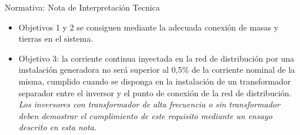\documentclass[aspectratio=169, usenames,svgnames,dvipsnames]{beamer}
\begin{document}
\begin{frame}[label={sec:org02cd40e}]{Normativa: Nota de Interpretación Tecnica}
\begin{itemize}
\item Objetivos 1 y 2 se consiguen mediante la adecuada conexión de masas y tierras en el sistema.

\item Objetivo 3: \guillemotleft{}\alert{la corriente continua inyectada en la red de distribución por una instalación generadora no será superior al 0,5\% de la corriente nominal de la misma}\guillemotright{}, cumplido \guillemotleft{}\alert{cuando se disponga en la instalación de un transformador separador entre el inversor y el punto de conexión de la red de distribución}\guillemotright{}. \emph{Los inversores con transformador de alta frecuencia o sin transformador deben demostrar el cumplimiento de este requisito mediante un ensayo descrito en esta nota}.
\end{itemize}
\end{frame}
\end{document}
